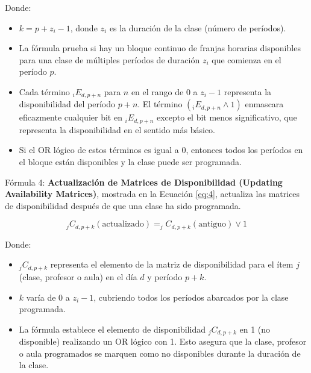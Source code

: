 Donde:
\begin{itemize}
    \item \( k = p + z_i - 1 \), donde \( z_i \) es la duración de la clase (número de períodos).
    \item La fórmula prueba si hay un bloque continuo de franjas horarias disponibles para una clase de múltiples períodos de duración \( z_i \) que comienza en el período \( p \).
    \item Cada término \( _iE_{d,p+n} \) para \( n \) en el rango de \( 0 \) a \( z_i-1 \) representa la disponibilidad del período \( p+n \).
    El término \( (_iE_{d,p+n} \wedge 1) \) enmascara eficazmente cualquier bit en \( _iE_{d,p+n} \) excepto el bit menos significativo, que representa la disponibilidad en el sentido más básico.
    \item Si el OR lógico de estos términos es igual a 0, entonces todos los períodos en el bloque están disponibles y la clase puede ser programada.
\end{itemize}

Fórmula 4: \textbf{Actualización de Matrices de Disponibilidad (Updating Availability Matrices)}, mostrada en la Ecuación \ref{eq:4}, actualiza las matrices de disponibilidad después de que una clase ha sido programada.

\begin{equation}
\label{eq:4}
_jC_{d, p+k} (\text{actualizado}) = _jC_{d, p+k} (\text{antiguo}) \vee 1
\end{equation}

Donde:
\begin{itemize}
    \item \( _jC_{d, p+k} \) representa el elemento de la matriz de disponibilidad para el ítem \( j \) (clase, profesor o aula) en el día \( d \) y período \( p+k \).
    \item \( k \) varía de 0 a \( z_i - 1 \), cubriendo todos los períodos abarcados por la clase programada.
    \item La fórmula establece el elemento de disponibilidad \( _jC_{d, p+k} \) en 1 (no disponible) realizando un OR lógico con 1.
    Esto asegura que la clase, profesor o aula programados se marquen como no disponibles durante la duración de la clase.
\end{itemize}
